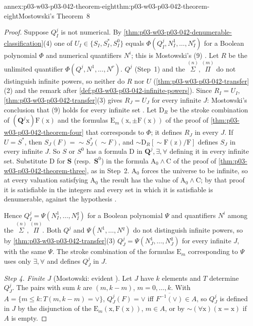 \begin{annexitem}{annex:p03-w03-p03-042-theorem-eight}{thm:p03-w03-p03-042-theorem-eight}{Mostowski's Theorem~8}
\begin{proof}
Suppose \(Q^j_I\) is not numerical.  By
\cref{thm:p03-w03-p03-042-denumerable-classification}(4) one of
\(U_I\in\{S_I,S^{*}_I,S^0_I\}\) equals \(\Phi(Q^j_I,N^1_I,\ldots,N^r_I)\)
for a Boolean polynomial \(\Phi\) and numerical quantifiers \(N^i\); this
is Mostowski's (9) \cite[p.~26]{Mostowski1957}.  Let \(R\) be the unlimited
quantifier \(\Phi(Q^j,N^1,\ldots,N^r)\).  \(Q^j\) (Step~1) and the
\(\overset{(n)}{\Sigma},\overset{(m)}{\Pi}\) do not distinguish infinite
powers, so neither do \(R\) nor \(U\)
(\cref{thm:p03-w03-p03-042-transfer}(2) and the remark after
\cref{def:p03-w03-p03-042-infinite-powers}).  Since \(R_I=U_I\),
\cref{thm:p03-w03-p03-042-transfer}(3) gives \(R_J=U_J\) for every infinite
\(J\): Mostowski's conclusion that (9) holds for every infinite set
\cite[p.~27]{Mostowski1957}.  Let \(\mathrm D_R\) be the stroke
combination of \((\mathbf Q^j\mathrm x)\mathrm F(\mathrm x)\) and the
formulas \(\mathrm E_m(\mathrm x,\pm\mathrm F(\mathrm x))\) of the proof of
\cref{thm:p03-w03-p03-042-theorem-four} that corresponds to \(\Phi\); it
defines \(R_J\) in every \(J\).  If \(U=S^{*}\), then \(S_J(F)={\sim}
S^{*}_J({\sim}F)\), and \({\sim}\mathrm D_R[{\sim}\mathrm F(\mathrm z)/
\mathrm F]\) defines \(S_J\) in every infinite \(J\).  So \(S\) or \(S^0\)
has a formula \(\mathrm D\) in \(\mathbf Q^j,\exists,\forall\) defining it
in every infinite set.  Substitute \(\mathrm D\) for \(\mathbf S\) (resp.\
\(\mathbf S^0\)) in the formula \(\mathrm A_0\wedge\mathrm C\) of the proof
of \cref{thm:p03-w03-p03-042-theorem-three}, as in Step~2.  \(\mathrm
A_0\) forces the universe to be infinite, so at every valuation
satisfying \(\mathrm A_0\) the result has the value of \(\mathrm A_0\wedge
\mathrm C\); by that proof it is satisfiable in the integers and every set
in which it is satisfiable is denumerable, against the hypothesis
\cite[p.~27]{Mostowski1957}.

Hence \(Q^j_I=\Psi(N^1_I,\ldots,N^q_I)\) for a Boolean polynomial \(\Psi\)
and quantifiers \(N^i\) among the \(\overset{(n)}\Sigma,\overset{(m)}\Pi\).
Both \(Q^j\) and \(\Psi(N^1,\ldots,N^q)\) do not distinguish infinite
powers, so by \cref{thm:p03-w03-p03-042-transfer}(3)
\(Q^j_J=\Psi(N^1_J,\ldots,N^q_J)\) for every infinite \(J\), with the same
\(\Psi\).  The stroke combination of the formulas \(\mathrm E_m\)
corresponding to \(\Psi\) uses only \(\exists,\forall\) and defines
\(Q^j_J\) in \(J\).

\emph{Step 4.  Finite \(J\)} (Mostowski: evident
\cite[p.~27]{Mostowski1957}).  Let \(J\) have \(k\) elements and \(T\)
determine \(Q^j_J\).  The pairs with sum \(k\) are \((m,k-m)\),
\(m=0,\ldots,k\).  With \(A=\{m\le k:T(m,k-m)=\vee\}\),
\(Q^j_J(F)=\vee\) iff \(\overline{F^{-1}(\vee)}\in A\), so \(Q^j_J\) is
defined in \(J\) by the disjunction of the \(\mathrm E_m(\mathrm x,\mathrm
F(\mathrm x))\), \(m\in A\), or by \({\sim}(\forall\mathrm x)(\mathrm x=
\mathrm x)\) if \(A\) is empty.
\end{proof}
\end{annexitem}

